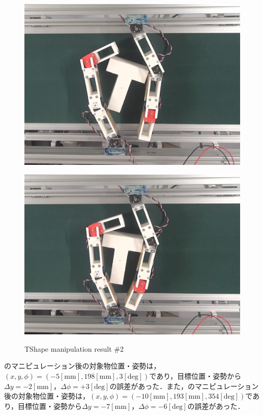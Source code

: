 \documentclass[a4paper,twoside,12pt,papersize, dvipdfmx]{iirthesis}
\begin{document}
\begin{figure}[b]
\begin{minipage}{0.249\hsize}
\includegraphics[width=0.98\hsize]{fig/4-manipulation-result/TShape/2-3.jpg}
\subcaption{}\label{}
\end{minipage}\hfill
\begin{minipage}{0.249\hsize}
\centering
\includegraphics[width=0.98\hsize]{fig/4-manipulation-result/TShape/2-4.jpg}
\subcaption{}\label{}
\end{minipage}
\caption{TShape manipulation result \#2}\label{fig::result::tm2}
\end{figure}

のマニピュレーション後の対象物位置・姿勢は，$(x, y, \phi) = (-5 \mathrm{[mm]}, 198 \mathrm{[mm]}, 3 \mathrm{[deg]})$であり，目標位置・姿勢から$\Delta y = -2 \mathrm{[mm]}$，$\Delta \phi = +3\mathrm{[deg]}$の誤差があった．また，のマニピュレーション後の対象物位置・姿勢は，$(x, y, \phi) = (-10 \mathrm{[mm]}, 193 \mathrm{[mm]}, 354 \mathrm{[deg]})$であり，目標位置・姿勢から$\Delta y = -7 \mathrm{[mm]}$，$\Delta \phi = -6 \mathrm{[deg]}$の誤差があった．\par
\end{document}
